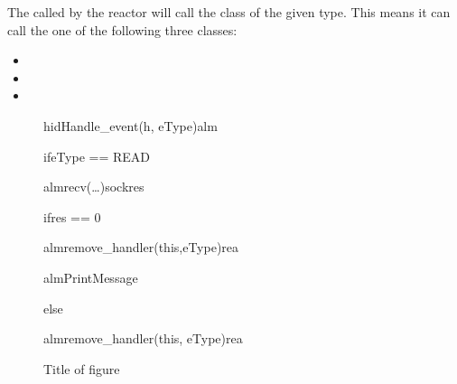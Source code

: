 \documentclass[Main]{subfiles}
\begin{document}
The  called by the reactor will call the class of the given type.
This means it can call the one of the following three classes:
\begin{itemize}
	\item {}
	\item {}
	\item {}
\end{itemize}

\newpage
\begin{figure}
\begin {sequencediagram}

	\begin{messcall}{hid}{Handle\_event(h, eType)}{alm}

		\begin{sdblock}{if}{eType == READ}
			\begin{call}{alm}{recv(\dots)}{sock}{res}
			\end{call}

			\begin{sdblock}{if}{res == 0}
				\begin{messcall}{alm}{remove\_handler(this,eType)}{rea}
				\end{messcall}


			\end{sdblock}

			\begin{callself}{alm}{PrintMessage}{}
			\end{callself}
		\end{sdblock}

		\begin{sdblock}{else}{}
			\begin{call}{alm}{remove\_handler(this, eType)}{rea}{}
			\end{call}
		\end{sdblock}

	\end{messcall}



\end{sequencediagram}

\caption{Title of figure}
\label{fig:alarmEventHandler}
\end{figure}
\end{document}
